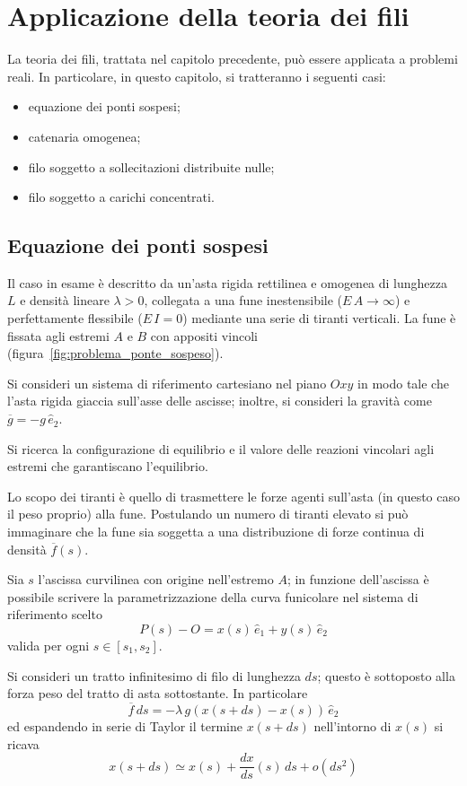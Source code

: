 \chapter{Applicazione della teoria dei fili}\label{chapter:applicazione_teoria_fili}

La teoria dei fili, trattata nel capitolo precedente, può essere applicata a problemi reali. 
In particolare, in questo capitolo, si tratteranno i seguenti casi:
\begin{itemize}
 \item equazione dei ponti sospesi;
 \item catenaria omogenea;
 \item filo soggetto a sollecitazioni distribuite nulle;
 \item filo soggetto a carichi concentrati.
\end{itemize}

\section{Equazione dei ponti sospesi}
\label{section:equazione_ponti_sospesi}
Il caso in esame è descritto da un'asta rigida rettilinea e omogenea di lunghezza $L$ e densità lineare $\lambda>0$, collegata a una fune inestensibile ($E\,A \to\infty$) e perfettamente flessibile ($E\,I=0$) mediante una serie di tiranti verticali. La fune è fissata agli estremi $A$ e $B$ con appositi vincoli (figura~\ref{fig:problema_ponte_sospeso}). 

Si consideri un sistema di riferimento cartesiano nel piano $Oxy$ in modo tale che l'asta rigida giaccia sull'asse delle ascisse; inoltre, si consideri la gravità come $\overline{g} = - g\,\hat{e}_2$.

Si ricerca la configurazione di equilibrio e il valore delle reazioni vincolari agli estremi che garantiscano l'equilibrio.

Lo scopo dei tiranti è quello di trasmettere le forze agenti sull'asta (in questo caso il peso proprio) alla fune. Postulando un numero di tiranti elevato si può immaginare che la fune sia soggetta a una distribuzione di forze continua di densità $\overline{f}(s)$.

Sia $s$ l'ascissa curvilinea con origine nell'estremo $A$; in funzione dell'ascissa è possibile scrivere la parametrizzazione della curva funicolare nel sistema di riferimento scelto
\[
 P(s) - O = x(s)\,\hat{e}_1 + y(s)\,\hat{e}_2
\]
valida per ogni $s\in[s_1, s_2]$.

Si consideri un tratto infinitesimo di filo di lunghezza $ds$; questo è sottoposto alla forza peso del tratto di asta sottostante. In particolare
\[
 \overline{f}\,ds = -\lambda\,g\left(x(s+ds) - x(s)\right)\,\hat{e}_2 
\]
ed espandendo in serie di Taylor il termine $x(s+ds)$ nell'intorno di $x(s)$ si ricava
\[
 x(s+ds)\simeq x(s) + \dfrac{dx}{ds}(s)\,ds + o(ds^2)
\]

